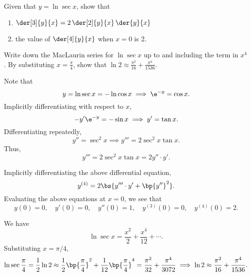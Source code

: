 \begin{problem}
    Given that $y = \ln \sec x$, show that

    \begin{enumerate}
        \item $\der[3]{y}{x} = 2 \, \der[2]{y}{x} \, \der{y}{x}$
        \item the value of $\der[4]{y}{x}$ when $x = 0$ is 2.
    \end{enumerate}

    Write down the MacLaurin series for $\ln \sec x$ up to and including the term in $x^4$. By substituting $x = \frac\pi4$, show that $\ln 2 \approx \frac{\pi^2}{16} + \frac{\pi^4}{1536}$.
\end{problem}
\begin{solution}
    \begin{ppart}
        Note that \[y = \ln \sec x = -\ln \cos x \implies \e^{-y} = \cos x.\] Implicitly differentiating with respect to $x$, \[-y' \e^{-y} = -\sin x \implies y' = \tan x.\] Differentiating repeatedly, \[y'' = \sec^2 x\implies y''' = 2\sec^2 x \tan x.\] Thus, \[y''' = 2\sec^2 x \tan x = 2 y'' \cdot y'.\]
    \end{ppart}
    \begin{ppart}
        Implicitly differentiating the above differential equation, \[y^{(4)} = 2\bs{y''' \cdot y' + \bp{y''}^2}.\] Evaluating the above equations at $x = 0$, we see that \[y(0) = 0, \quad y'(0) = 0, \quad y''(0) = 1, \quad y^{(3)}(0) = 0, \quad y^{(4)}(0) = 2.\]
    \end{ppart}

    We have \[\ln \sec x = \frac{x^2}2  + \frac{x^4}{12} + \cdots.\] Substituting $x = \pi/4$, \[\ln \sec \frac\pi4 = \frac12 \ln2 \approx \frac12 \bp{\frac\pi4}^2 + \frac1{12} \bp{\frac\pi4}^4 = \frac{\pi^2}{32} + \frac{\pi^4}{3072} \implies \ln 2 \approx \frac{\pi^2}{16} + \frac{\pi^4}{1536}.\]
\end{solution}